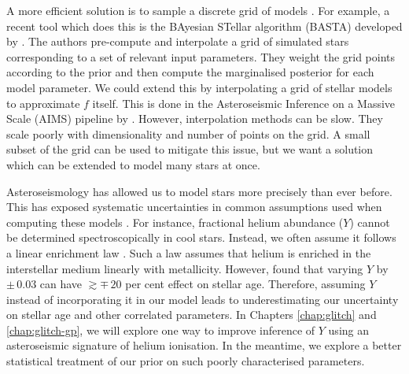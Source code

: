 A more efficient solution is to sample a discrete grid of models \citep{Gruberbauer.Guenther.ea2012,Gruberbauer.Guenther.ea2013}. For example, a recent tool which does this is the BAyesian STellar algorithm (BASTA) developed by \citet{AguirreBorsen-Koch.Rorsted.ea2022}. The authors pre-compute and interpolate a grid of simulated stars corresponding to a set of relevant input parameters. They weight the grid points according to the prior and then compute the marginalised posterior for each model parameter. We could extend this by interpolating a grid of stellar models to approximate \(f\) itself. This is done in the Asteroseismic Inference on a Massive Scale (AIMS) pipeline by \citet{Lund.Reese2018,Rendle.Buldgen.ea2019}. However, interpolation methods can be slow. They scale poorly with dimensionality and number of points on the grid. A small subset of the grid can be used to mitigate this issue, but we want a solution which can be extended to model many stars at once.

Asteroseismology has allowed us to model stars more precisely than ever before. This has exposed systematic uncertainties in common assumptions used when computing these models \citep[e.g.][]{Tayar.Claytor.ea2022}. For instance, fractional helium abundance (\(Y\)) cannot be determined spectroscopically in cool stars. Instead, we often assume it follows a linear enrichment law \citep{Chiosi.Matteucci1982,Ribas.Jordi.ea2000,Casagrande.Flynn.ea2007}. Such a law assumes that helium is enriched in the interstellar medium linearly with metallicity. However, \citet{Lebreton.Goupil.ea2014} found that varying \(Y\) by \(\pm\,0.03\) can have \(\gtrsim \mp\,20\) per cent effect on stellar age. Therefore, assuming \(Y\) instead of incorporating it in our model leads to underestimating our uncertainty on stellar age and other correlated parameters. In Chapters \ref{chap:glitch} and \ref{chap:glitch-gp}, we will explore one way to improve inference of \(Y\) using an asteroseismic signature of helium ionisation. In the meantime, we explore a better statistical treatment of our prior on such poorly characterised parameters.


